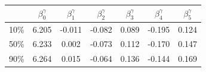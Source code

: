 \begin{tabular}{ccccccc}
\hline
 & $\beta_0^{\gamma}$ & $\beta_1^{\gamma}$ & $\beta_2^{\gamma}$ & $\beta_3^{\gamma}$ & $\beta_4^{\gamma}$ & $\beta_5^{\gamma}$ \\
\hline
10\% &  6.205 & -0.011 & -0.082 & 0.089 & -0.195 & 0.124 \\
50\% & 6.233 & 0.002  & -0.073 & 0.112 & -0.170 & 0.147 \\
90\% &  6.264 & 0.015  & -0.064 & 0.136 & -0.144 & 0.169 \\
\hline
\end{tabular}